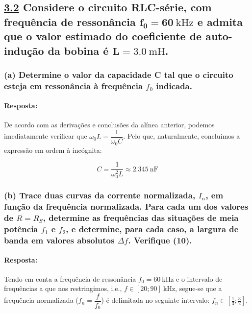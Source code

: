 \clearpage
\subsection*{\underline{3.2} Considere o circuito RLC-série, com frequência de ressonância $\mathbf{f_0 = 60}\ \text{kHz}$ e admita que o valor estimado do coeficiente de auto-indução da bobina é $\mathbf{L = 3.0}\ \text{mH}$.}
\subsubsection*{(a) Determine o valor da capacidade C tal que o circuito esteja em ressonância à frequência $f_0$ indicada.}
\label{subsubsec_a}
\paragraph{Resposta:}
De acordo com as derivações e conclusões da alínea anterior, podemos imediatamente verificar que $\omega_0 L = \dfrac{1}{\omega_0 C}$. Pelo que, naturalmente, concluímos a expressão em ordem à incógnita:

$$
C = \frac{1}{\omega_0^2 L} \approx 2.345\ \text{nF}
$$

\subsubsection*{(b) Trace duas curvas da corrente normalizada, $I_n$, em função da frequência normalizada. Para cada um dos valores de $R=R_S$, determine as frequências das situações de meia potência $f_1$ e $f_2$, e determine, para cada caso, a largura de banda em valores absolutos $\Delta f$. Verifique (10).}
\label{subsubsec_b}
\paragraph{Resposta:}
Tendo em conta a frequência de ressonância $f_0 = 60\ \text{kHz}$ e o intervalo de frequências a que nos restringimos, i.e., $f \in \left[20; 90\right]\ \text{kHz}$, segue-se que a frequência normalizada ($f_n = \dfrac{f}{f_0}$) é delimitada no seguinte
intervalo: $f_n \in \left[\frac{1}{3}; \frac{3}{2}\right]$. 

